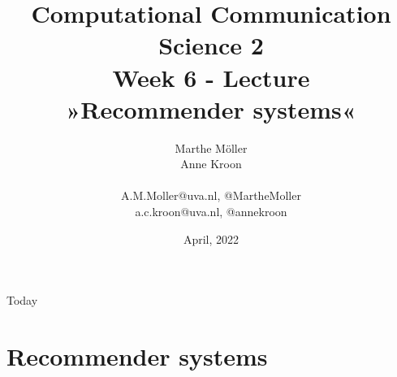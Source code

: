 \documentclass[compress]{beamer}
\title[Computational Communication Science 2]{\textbf{Computational Communication Science 2} \\Week 6 - Lecture\\ »Recommender systems«}
\author[Marthe Möller, Anne Kroon]{Marthe Möller \\ Anne Kroon \\ ~ \\ \footnotesize{A.M.Moller@uva.nl, @MartheMoller \\a.c.kroon@uva.nl, @annekroon} \\}
\date{April, 2022}
\institute[Digital Society Minor, University of Amsterdam]{Digital Society Minor, University of Amsterdam}
\begin{document}
	
	\begin{frame}{}
		\titlepage
	\end{frame}
	
	\begin{frame}{Today}
		\tableofcontents
	\end{frame}

\section{Recommender systems}


\begin{frame}
\end{frame}

\end{document}
